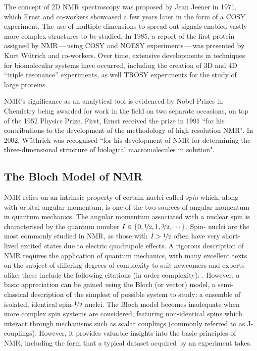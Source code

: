 The concept of \ac{2D} \ac{NMR} spectroscopy was proposed by Jean Jeener in
1971\cite{Jeener1971, Jeener2016}, which Ernst and co-workers showcased a few
years later in the form of a \ac{COSY} experiment\cite{Aue1976a}. The use of
multiple dimensions to spread out signals enabled vastly more complex
structures to be studied. In 1985, a report of the first protein assigned by
\ac{NMR}\,---\,using \ac{COSY} and \ac{NOESY} experiments\,---\,was presented
by Kurt W\"utrich and co-workers\cite{Williamson1985}. Over time, extensive
developments in techniques for biomolecular systems have occurred, including
the creation of 3D and 4D ``triple resonance'' experiments\cite{Marion1989,
Kay1990}, as well \ac{TROSY} experiments\cite{Pervushin1997} for the study of
large proteins.

\ac{NMR}'s significance as an analytical tool is evidenced by Nobel Prizes in
Chemistry being awarded for work in the field on two separate occasions, on top
of the 1952 Physics Prize. First,
Ernst received the prize in 1991 ``for his contributions to the development of
the methodology of high resolution \acl{NMR}"\cite{Ernst1992}. In 2002,
W\"uthrich was recognised ``for his development of \acl{NMR} for determining
the three-dimensional structure of biological macromolecules in
solution"\cite{Wuthrich2003}.

\subsection{The Bloch Model of \acs{NMR}}

\ac{NMR} relies on an intrinsic property of certain nuclei called \textit{spin}
which, along with orbital angular momentum, is one of the two sources of
angular momentum in quantum mechanics.
The angular momentum associated with a nuclear spin is characterised by the
quantum number $I \in \lbrace 0, \nicefrac{1}{2}, 1, \nicefrac{3}{2}, \cdots
\rbrace$. Spin-
nuclei are the most commonly studied in \ac{NMR}, as those with $I >
\nicefrac{1}{2}$ often have very short-lived excited states due to electric
quadrupole effects. A rigorous description of \ac{NMR} requires the application
of quantum mechanics, with many excellent texts on the subject of differing
degrees of complexity to suit newcomers and experts alike; these include the
following citations (in order complexity):
\cite{Hore2015,Levitt2007,Cavanagh2007,Goldman1988,Abragam1961}.
However, a basic
appreciation can be gained using the Bloch (or vector) model, a semi-classical
description of the simplest of possible system to study: a ensemble of
isolated, identical spin-$\nicefrac{1}{2}$ nuclei\cite[Chapter 1]{Hore2015}.
The Bloch model becomes inadequate when more complex spin systems are
considered, featuring non-identical spins which interact through mechanisms
such as scalar couplings (commonly referred to as J-couplings). However,
it provides valuable insights into the basic principles of \ac{NMR},
including the form that a typical dataset acquired by an experiment takes.

